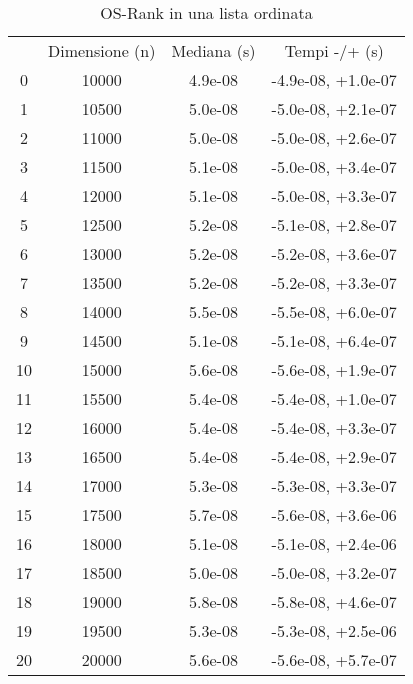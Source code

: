 \begin{table}
\centering
\caption{OS-Rank in una lista ordinata}
\label{OS-Rank in una lista ordinata}
\begin{adjustbox}{width=1\textwidth/2}
\begin{tabular}{|c|c|c|c|}
\hline
 & Dimensione (n) & Mediana (s) & Tempi -/+ (s) \\
0 & 10000 & 4.9e-08 & -4.9e-08, +1.0e-07 \\
\cline{1-4}
1 & 10500 & 5.0e-08 & -5.0e-08, +2.1e-07 \\
\cline{1-4}
2 & 11000 & 5.0e-08 & -5.0e-08, +2.6e-07 \\
\cline{1-4}
3 & 11500 & 5.1e-08 & -5.0e-08, +3.4e-07 \\
\cline{1-4}
4 & 12000 & 5.1e-08 & -5.0e-08, +3.3e-07 \\
\cline{1-4}
5 & 12500 & 5.2e-08 & -5.1e-08, +2.8e-07 \\
\cline{1-4}
6 & 13000 & 5.2e-08 & -5.2e-08, +3.6e-07 \\
\cline{1-4}
7 & 13500 & 5.2e-08 & -5.2e-08, +3.3e-07 \\
\cline{1-4}
8 & 14000 & 5.5e-08 & -5.5e-08, +6.0e-07 \\
\cline{1-4}
9 & 14500 & 5.1e-08 & -5.1e-08, +6.4e-07 \\
\cline{1-4}
10 & 15000 & 5.6e-08 & -5.6e-08, +1.9e-07 \\
\cline{1-4}
11 & 15500 & 5.4e-08 & -5.4e-08, +1.0e-07 \\
\cline{1-4}
12 & 16000 & 5.4e-08 & -5.4e-08, +3.3e-07 \\
\cline{1-4}
13 & 16500 & 5.4e-08 & -5.4e-08, +2.9e-07 \\
\cline{1-4}
14 & 17000 & 5.3e-08 & -5.3e-08, +3.3e-07 \\
\cline{1-4}
15 & 17500 & 5.7e-08 & -5.6e-08, +3.6e-06 \\
\cline{1-4}
16 & 18000 & 5.1e-08 & -5.1e-08, +2.4e-06 \\
\cline{1-4}
17 & 18500 & 5.0e-08 & -5.0e-08, +3.2e-07 \\
\cline{1-4}
18 & 19000 & 5.8e-08 & -5.8e-08, +4.6e-07 \\
\cline{1-4}
19 & 19500 & 5.3e-08 & -5.3e-08, +2.5e-06 \\
\cline{1-4}
20 & 20000 & 5.6e-08 & -5.6e-08, +5.7e-07 \\
\cline{1-4}
\end{tabular}
\end{adjustbox}
\end{table}
